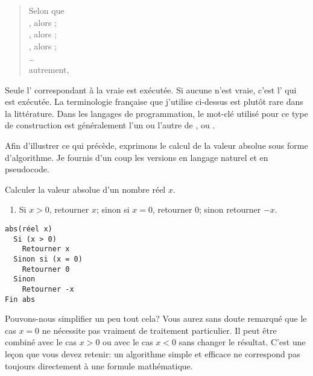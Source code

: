 \begin{itemize}
  \begin{quote}
    Selon que \\
    , alors ; \\
    , alors ; \\
    , alors ; \\
    \dots \\
    autrement, 
  \end{quote}
  Seule l' correspondant à la  vraie est
  exécutée. Si aucune  n'est vraie, c'est
  l' qui est exécutée. La terminologie
  française que j'utilise ci-dessus est plutôt rare dans la
  littérature. Dans les langages de programmation, le mot-clé utilisé
  pour ce type de construction est généralement l'un ou l'autre
  de ,  ou .
\end{itemize}

Afin d'illustrer ce qui précède, exprimons le calcul de la valeur
absolue sous forme d'algorithme. Je fournis d'un coup les versions en
langage naturel et en pseudocode.

\begin{algorithme}
  \label{algo:algorithmes:abs}
  Calculer la valeur absolue d'un nombre réel $x$.

  \noindent
  \begin{minipage}[t]{0.48\linewidth}
    \begin{enumerate}
    \item Si $x > 0$, retourner $x$; sinon si $x = 0$, retourner $0$;
      sinon retourner $-x$.
    \end{enumerate}
  \end{minipage}
  \hfill
  \begin{minipage}[t]{0.48\linewidth}
    \begin{Schunk}
\begin{Verbatim}
abs(réel x)
  Si (x > 0)
    Retourner x
  Sinon si (x = 0)
    Retourner 0
  Sinon
    Retourner -x
Fin abs
\end{Verbatim}
    \end{Schunk}
  \end{minipage}
\end{algorithme}

Pouvons-nous simplifier un peu tout cela? Vous aurez sans doute
remarqué que le cas $x = 0$ ne nécessite pas vraiment de traitement
particulier. Il peut être combiné avec le cas $x > 0$ ou avec le cas
$x < 0$ sans changer le résultat. C'est une leçon que vous devez
retenir: un algorithme simple et efficace ne correspond pas toujours
directement à une formule mathématique.

